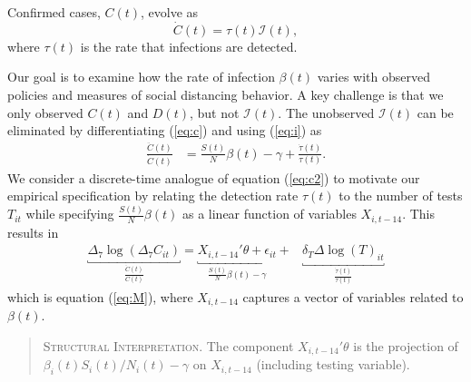 \documentclass[9pt,twoside,lineno]{pnas-new}
\theoremstyle{definition}
\providecommand{\Infected}{{\mathcal{I}}}
\begin{document}
Confirmed cases, $C(t)$, evolve as
\begin{equation}
  \dot{C}(t) = \tau(t) \Infected(t), \label{eq:c}
\end{equation}
where $\tau(t)$ is the rate that infections are detected.

Our goal is to examine how the rate of infection $\beta(t)$ varies with observed policies
and measures of social distancing behavior. A key challenge is that we only
observed $C(t)$ and $D(t)$, but not $\Infected(t)$. The unobserved $\Infected(t)$ can
be eliminated by differentiating (\ref{eq:c}) and using (\ref{eq:i})  as
\begin{align}
  \frac{\ddot{C}(t)}{\dot{C}(t)}
              & =
                \frac{S(t)}{N} \beta(t) -\gamma  + \frac{\dot{\tau}(t)}{\tau(t)}. \label{eq:c2}
\end{align}
We consider a discrete-time analogue of equation (\ref{eq:c2}) to motivate our empirical
specification by relating the detection rate $\tau(t)$  to the number of tests $T_{it}$ while specifying $\frac{S(t)}{N}\beta(t)$ as a linear function of variables $X_{i,t-14}$.
This results in
\begin{align}
  \underbracket{\Delta_7 \log(\Delta_7 C_{it})}_{\frac{\ddot{C}(t)}{\dot{C}(t)}}
  =
      \underbracket{X_{i,t-14}' \theta + \epsilon_{it}}_{\frac{S(t)}{N}\beta(t) -\gamma}
       +
       & \underbracket{\delta_T \Delta
      \log(T)_{it}}_{\frac{\dot{\tau}(t)}{\tau(t)} } \nonumber
\end{align}
which is equation (\ref{eq:M}), where $X_{i,t-14}$ captures a vector of variables related to $\beta(t)$.

\begin{quote}
\textsc{Structural Interpretation}. The component $X_{i,t-14}' \theta$
is the projection of $\beta_i(t)S_{i}(t)/N_{i}(t)  - \gamma$ on   $X_{i,t-14}$ (including
testing variable).
\end{quote}
\end{document}
